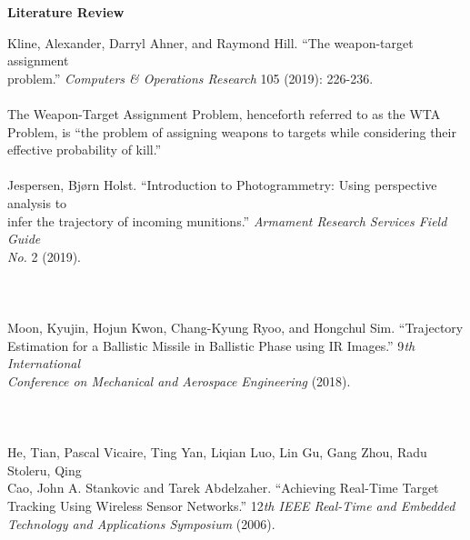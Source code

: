 \documentclass[12pt]{article} %
\begin{document}
 
\begin{center}
\textbf{Literature Review}
\end{center}
\bigskip

\noindent
Kline, Alexander, Darryl Ahner, and Raymond Hill. ``The weapon-target assignment\\
\indent problem.'' \textit{Computers \& Operations Research} 105 (2019): 226-236.\\
\vspace{0.5cm}\\
\indent The Weapon-Target Assignment Problem, henceforth referred to as the WTA Problem, is 
``the problem of assigning weapons to targets while considering their effective probability of kill.''
\ \\ \vspace{0.5cm}\\

\noindent
Jespersen, Bjørn Holst. ``Introduction to Photogrammetry: Using perspective analysis to\\
\indent infer the trajectory of incoming munitions.'' \textit{Armament Research Services Field Guide\\ \indent No.} 2 (2019).
\ \\ \vspace{0.5cm}\\

\ \\ \vspace{0.5cm}\\

\noindent
Moon, Kyujin, Hojun Kwon, Chang-Kyung Ryoo, and Hongchul Sim. ``Trajectory\\
\indent Estimation for a Ballistic Missile in Ballistic Phase using IR Images.'' 9\textit{th International
\\ \indent Conference on Mechanical and Aerospace Engineering} (2018).
\ \\ \vspace{0.5cm}\\

\ \\ \vspace{0.5cm}\\
\noindent
He, Tian, Pascal Vicaire, Ting Yan, Liqian Luo, Lin Gu, Gang Zhou,
Radu Stoleru, Qing\\
\indent Cao, John A. Stankovic and Tarek Abdelzaher. ``Achieving Real-Time Target\\
\indent Tracking Using Wireless Sensor Networks.'' 12\textit{th IEEE Real-Time and Embedded\\
\indent Technology and Applications Symposium} (2006).
\ \\ \vspace{0.5cm}\\
\end{document}

